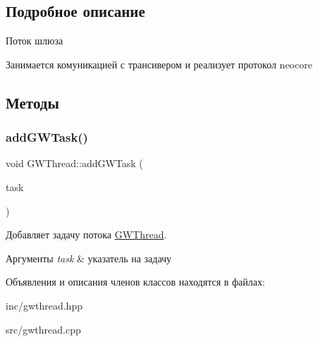 \subsection{Подробное описание}
Поток шлюза 

Занимается комуникацией с трансивером и реализует протокол neocore 

\subsection{Методы}
\mbox{\label{classGWThread_a29349a2536b59b5725d847394103d081}} 
\subsubsection{\texorpdfstring{add\+G\+W\+Task()}{addGWTask()}}
{\footnotesize\ttfamily void G\+W\+Thread\+::add\+G\+W\+Task (\begin{DoxyParamCaption}\item[{\hyperlink{classGWTask}{G\+W\+Task} \&}]{task }\end{DoxyParamCaption})}



Добавляет задачу потока \hyperlink{classGWThread}{G\+W\+Thread}. 


\begin{DoxyParams}{Аргументы}
{\em task} & указатель на задачу \\
\hline
\end{DoxyParams}


Объявления и описания членов классов находятся в файлах\+:\begin{DoxyCompactItemize}
\item 
inc/gwthread.\+hpp\item 
src/gwthread.\+cpp\end{DoxyCompactItemize}
